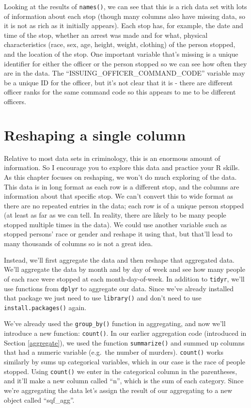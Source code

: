 \documentclass[
]{krantz}
\begin{document}
Looking at the results of \texttt{names()}, we can see that
this is a rich data set with lots of information about each
stop (though many columns also have missing data, so it is
not as rich as it initially appears). Each stop has, for
example, the date and time of the stop, whether an arrest
was made and for what, physical characteristics (race, sex,
age, height, weight, clothing) of the person stopped, and
the location of the stop. One important variable that's
missing is a unique identifier for either the officer or the
person stopped so we can see how often they are in the data.
The ``ISSUING\_OFFICER\_COMMAND\_CODE'' variable may be a
unique ID for the officer, but it's not clear that it is -
there are different officer ranks for the same command code
so this appears to me to be different officers.

\hypertarget{reshaping-a-single-column}{%
\section{Reshaping a single
column}\label{reshaping-a-single-column}}

Relative to most data sets in criminology, this is an
enormous amount of information. So I encourage you to
explore this data and practice your R skills. As this
chapter focuses on reshaping, we won't do much exploring of
the data. This data is in long format as each row is a
different stop, and the columns are information about that
specific stop. We can't convert this to wide format as there
are no repeated entries in the data; each row is of a unique
person stopped (at least as far as we can tell. In reality,
there are likely to be many people stopped multiple times in
the data). We could use another variable such as stopped
persons' race or gender and reshape it using that, but
that'll lead to many thousands of columns so is not a great
idea.

Instead, we'll first aggregate the data and then reshape
that aggregated data. We'll aggregate the data by month and
by day of week and see how many people of each race were
stopped at each month-day-of-week. In addition to
\texttt{tidyr}, we'll use functions from \texttt{dplyr} to
aggregate our data. Since we've already installed that
package we just need to use \texttt{library()} and don't
need to use \texttt{install.packages()} again.

We've already used the \texttt{group\_by()} function in
aggregating, and now we'll introduce a new function:
\texttt{count()}. In our earlier aggregation code
(introduced in Section \ref{aggregate}), we used the
function \texttt{summarize()} and summed up columns that had
a numeric variable (e.g.~the number of murders).
\texttt{count()} works similarly by sums up categorical
variables, which in our case is the race of people stopped.
Using \texttt{count()} we enter in the categorical column in
the parentheses, and it'll make a new column called ``n'',
which is the sum of each category. Since we're aggregating
the data let's assign the result of our aggregating to a new
object called ``sqf\_agg''.
\end{document}
